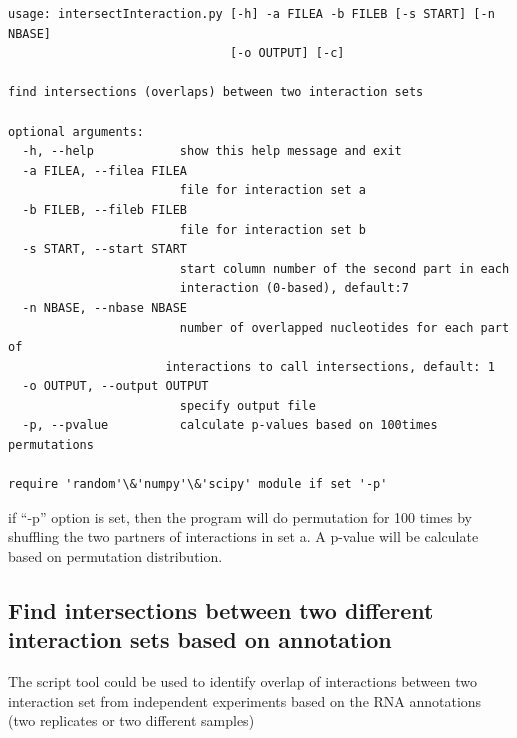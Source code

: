 \documentclass[letterpaper,10pt,english]{sphinxmanual}
\begin{document}
\begin{Verbatim}[commandchars=\\\{\}]
usage: intersectInteraction.py [-h] -a FILEA -b FILEB [-s START] [-n NBASE]
                               [-o OUTPUT] [-c]

find intersections (overlaps) between two interaction sets

optional arguments:
  -h, --help            show this help message and exit
  -a FILEA, --filea FILEA
                        file for interaction set a
  -b FILEB, --fileb FILEB
                        file for interaction set b
  -s START, --start START
                        start column number of the second part in each
                        interaction (0-based), default:7
  -n NBASE, --nbase NBASE
                        number of overlapped nucleotides for each part of
                      interactions to call intersections, default: 1
  -o OUTPUT, --output OUTPUT
                        specify output file
  -p, --pvalue          calculate p-values based on 100times permutations

require 'random'\&'numpy'\&'scipy' module if set '-p'
\end{Verbatim}

if ``-p'' option is set, then the program will do permutation for 100 times by shuffling the two partners of interactions in set a. A p-value will be calculate based on permutation distribution.


\subsection{Find intersections between two different interaction sets based on annotation}
\label{Analysis_pipeline:intersectiongene}\label{Analysis_pipeline:find-intersections-between-two-different-interaction-sets-based-on-annotation}
The script tool  could be used to identify overlap of interactions between two interaction set from independent experiments based on the RNA annotations (two replicates or two different samples)
\end{document}
